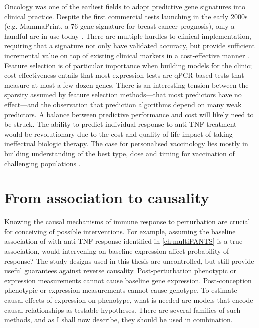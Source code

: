 Oncology was one of the earliest fields to adopt predictive gene signatures into clinical practice.
Despite the first commercial tests launching in the early 2000s (e.g. MammaPrint, a 76-gene signature for breast cancer prognosis),
only a handful are in use today \autocite{chibon2013CancerGeneExpression,michiels2016StatisticalControversiesClinical,kwa2017ClinicalUtilityGeneexpression}. 
There are multiple hurdles to clinical implementation,
requiring that a signature not only have validated accuracy, 
but provide sufficient incremental value on top of existing clinical markers in a cost-effective manner \autocite{michiels2016StatisticalControversiesClinical}.
Feature selection is of particular importance when building models for the clinic; 
cost-effectiveness entails that most expression tests are qPCR-based tests that measure at most a few dozen genes.
There is an interesting tension between the sparsity assumed by feature selection methods---that most predictors have no effect---and the observation that prediction algorithms depend on many weak predictors.
A balance between predictive performance and cost will likely need to be struck.
The ability to predict individual response to anti-\gls{TNF} treatment would be revolutionary due to the cost and quality of life impact of taking ineffectual biologic therapy.
The case for personalised vaccinology lies mostly in building understanding of the best type, dose and timing for vaccination of challenging populations \autocite{poland2018PersonalizedVaccinologyReview}.

%

\section{From association to causality}

Knowing the causal mechanisms of immune response to perturbation are crucial for conceiving of possible interventions.
For example, assuming the baseline association of  with anti-\gls{TNF} response identified in \cref{ch:multiPANTS} is a true association,
would intervening on baseline  expression affect probability of response?
The study designs used in this thesis are uncontrolled, but still provide useful guarantees against reverse causality.
Post-perturbation phenotypic or expression measurements cannot cause baseline gene expression.
Post-conception phenotypic or expression measurements cannot cause genotype.
To estimate causal effects of expression on phenotype,
what is needed are models that encode causal relationships as testable hypotheses.
There are several families of such methods, and as I shall now describe, they should be used in combination.

